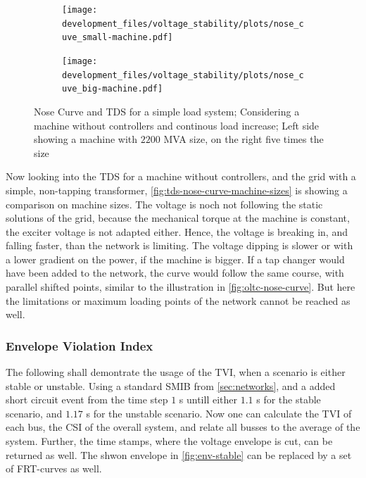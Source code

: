 \begin{figure}[htbp!]
    \centering
    \begin{subfigure}[b]{.49\linewidth}
        \centering
        \texttt{[image: development\_files/voltage\_stability/plots/nose\_cuve\_small-machine.pdf]}
    \end{subfigure}
    \begin{subfigure}[b]{.49\linewidth}
        \centering
        \texttt{[image: development\_files/voltage\_stability/plots/nose\_cuve\_big-machine.pdf]}
    \end{subfigure}
    \caption[Nose Curve and \acs{TDS} for a simple load system without machine controllers]{Nose Curve and \acs{TDS} for a simple load system; Considering a machine without controllers and continous load increase; Left side showing a machine with $2200$ MVA size, on the right five times the size}
    \label{fig:tds-nose-curve-machine-sizes}
\end{figure}

Now looking into the \acs{TDS} for a machine without controllers, and the grid with a simple, non-tapping transformer, \autoref{fig:tds-nose-curve-machine-sizes} is showing a comparison on machine sizes.
The voltage is noch not following the static solutions of the grid, because the mechanical torque at the machine is constant, the exciter voltage is not adapted either.
Hence, the voltage is breaking in, and falling faster, than the network is limiting.
The voltage dipping is slower or with a lower gradient on the power, if the machine is bigger.
If a tap changer would have been added to the network, the curve would follow the same course, with parallel shifted points, similar to the illustration in \autoref{fig:oltc-nose-curve}.
But here the limitations or maximum loading points of the network cannot be reached as well.

\subsubsection{Envelope Violation Index}

The following shall demontrate the usage of the \acf{TVI}, when a scenario is either stable or unstable.
Using a standard \acs{SMIB} from \autoref{sec:networks}, and a added short circuit event from the time step $1$ s untill either $1.1$ s for the stable scenario, and $1.17$ s for the unstable scenario.
Now one can calculate the \acs{TVI} of each bus, the \acs{CSI} of the overall system, and relate all busses to the average of the system.
Further, the time stamps, where the voltage envelope is cut, can be returned as well. 
The shwon envelope in \autoref{fig:env-stable} can be replaced by a set of \acs{FRT}-curves as well.

